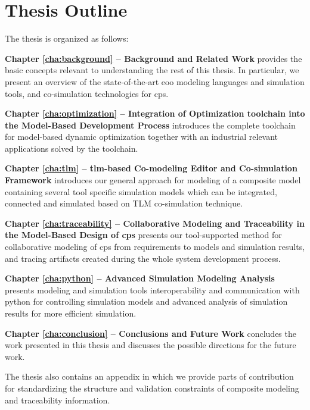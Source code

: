 \section{Thesis Outline}
\label{sec:Thesis Outline}

The thesis is organized as follows:

\begin{description}
	
\item \textbf{Chapter \ref{cha:background} – Background and Related Work } provides the basic concepts relevant to understanding the rest of this thesis.  In particular, we present an overview of the state-of-the-art \acrshort{eoo} modeling languages and simulation tools, and co-simulation technologies for \acrshort{cps}. 

\item \textbf{Chapter \ref{cha:optimization} – Integration of Optimization toolchain into the Model-Based Development Process} introduces the complete toolchain for model-based dynamic optimization together with an industrial relevant applications solved by the toolchain.

\item \textbf{Chapter \ref{cha:tlm} – \acrshort{tlm}-based Co-modeling Editor and Co-simulation Framework} introduces our general approach for modeling of a composite model containing several tool specific simulation models which can be integrated, connected and simulated based on TLM co-simulation technique.

\item \textbf{Chapter \ref{cha:traceability} – Collaborative Modeling and Traceability in the Model-Based Design of \acrshort{cps}} presents our tool-supported method for collaborative modeling of \acrshort{cps} from requirements to models and simulation results, and tracing artifacts created during the whole system development process.  

\item \textbf{Chapter \ref{cha:python} – Advanced Simulation Modeling Analysis} presents modeling and simulation tools interoperability and communication with python for controlling simulation models and advanced analysis of simulation results for more efficient simulation.

\item \textbf{Chapter \ref{cha:conclusion} – Conclusions and Future Work} concludes the work presented in this thesis and discusses the possible directions for the future work.

\end{description}

The thesis also contains an appendix in which we provide parts of contribution for standardizing the structure and validation constraints of composite modeling and traceability information.




